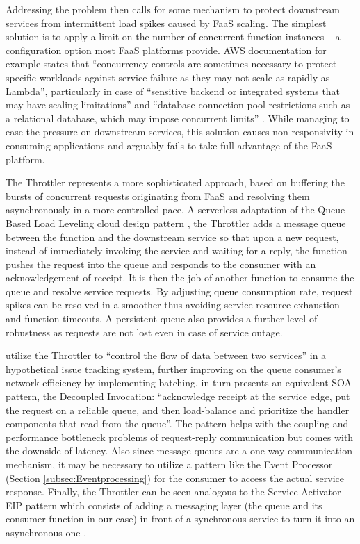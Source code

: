 Addressing the problem then calls for some mechanism to protect downstream services from intermittent load spikes caused by FaaS scaling. The simplest solution is to apply a limit on the number of concurrent function instances -- a configuration option most FaaS platforms provide. AWS documentation for example states that ``concurrency controls are sometimes necessary to protect specific workloads against service failure as they may not scale as rapidly as Lambda'', particularly in case of ``sensitive backend or integrated systems that may have scaling limitations'' and ``database connection pool restrictions such as a relational database, which may impose concurrent limits'' \parencite{aws18serverlessLens}. While managing to ease the pressure on downstream services, this solution causes non-responsivity in consuming applications and arguably fails to take full advantage of the FaaS platform.

The Throttler represents a more sophisticated approach, based on buffering the bursts of concurrent requests originating from FaaS and resolving them asynchronously in a more controlled pace. A serverless adaptation of the Queue-Based Load Leveling cloud design pattern \parencite{microsoft18cloudPatterns}, the Throttler adds a message queue between the function and the downstream service so that upon a new request, instead of immediately invoking the service and waiting for a reply, the function pushes the request into the queue and responds to the consumer with an acknowledgement of receipt. It is then the job of another function to consume the queue and resolve service requests. By adjusting queue consumption rate, request spikes can be resolved in a smoother thus avoiding service resource exhaustion and function timeouts. A persistent queue also provides a further level of robustness as requests are not lost even in case of service outage.

\textcite{baldini17currentTrends} utilize the Throttler to ``control the flow of data between two services'' in a hypothetical issue tracking system, further improving on the queue consumer's network efficiency by implementing batching. \textcite{rotem12soa} in turn presents an equivalent SOA pattern, the Decoupled Invocation: ``acknowledge receipt at the service edge, put the request on a reliable queue, and then load-balance and prioritize the handler components that read from the queue''. The pattern helps with the coupling and performance bottleneck problems of request-reply communication but comes with the downside of latency. Also since message queues are a one-way communication mechanism, it may be necessary to utilize a pattern like the Event Processor (Section \ref{subsec:Eventprocessing}) for the consumer to access the actual service response. Finally, the Throttler can be seen analogous to the Service Activator EIP pattern which consists of adding a messaging layer (the queue and its consumer function in our case) in front of a synchronous service to turn it into an asynchronous one \parencite{hohpe2004enterprise}.

